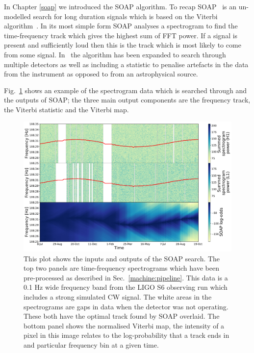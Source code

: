 %
In Chapter \ref{soap} we introduced the SOAP algorithm. 
To recap SOAP~\cite{bayley2019SOAPGeneralised} is an un-modelled search for long
duration signals which is based on the Viterbi
algorithm~\cite{viterbi1967ErrorBounds}. In its most simple form SOAP
analyses a spectrogram to find the time-frequency track which gives the highest
sum of \gls{FFT} power. If a signal is present and sufficiently loud then this
is the track which is most likely to come from some signal.
In~\cite{bayley2019SOAPGeneralised} the algorithm has been expanded to
search through multiple detectors as well as including a statistic to penalise
artefacts in the data from the instrument as opposed to from an astrophysical
source. 

%
Fig.~\ref{soap:viterbiplot} shows an example of the spectrogram data which is
searched through and the outputs of SOAP; the three main output components are
the frequency track, the Viterbi statistic and the Viterbi map.

\begin{figure}[ht]
	\includegraphics[scale=0.43]{C4_cnn/two_vit_example.pdf}
	\caption[Example SOAP output from H1 and L1 input spectrograms. ]{\label{soap:viterbiplot} This plot shows the inputs and outputs of the
		SOAP search. The top two panels are time-frequency spectrograms which have been pre-processed as described in Sec.~\ref{machine:pipeline}. This
		data is a 0.1 Hz wide frequency band from the \gls{LIGO} S6 observing run which includes a strong simulated \gls{CW} signal. The white areas in the spectrograms are gaps in data when the detector was not operating. These both have the
		optimal track found by SOAP overlaid. The bottom panel shows the normalised Viterbi map, the intensity of a
		pixel in this image relates to the log-probability that a track ends in and
		particular frequency bin at a given time.}
\end{figure}


